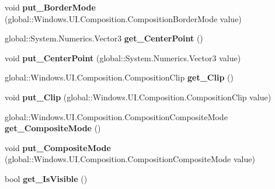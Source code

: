 \begin{DoxyCompactItemize}
void {\bfseries put\+\_\+\+Border\+Mode} (global\+::\+Windows.\+U\+I.\+Composition.\+Composition\+Border\+Mode value)
\item 
\mbox{\label{interface_windows_1_1_u_i_1_1_composition_1_1_i_visual_a155a09b37b8789970281666bc3111f3d}} 
global\+::\+System.\+Numerics.\+Vector3 {\bfseries get\+\_\+\+Center\+Point} ()
\item 
\mbox{\label{interface_windows_1_1_u_i_1_1_composition_1_1_i_visual_ac736f9c5171d694ea168970125dee881}} 
void {\bfseries put\+\_\+\+Center\+Point} (global\+::\+System.\+Numerics.\+Vector3 value)
\item 
\mbox{\label{interface_windows_1_1_u_i_1_1_composition_1_1_i_visual_ad0c2e9949756caf002a9224770412cd2}} 
global\+::\+Windows.\+U\+I.\+Composition.\+Composition\+Clip {\bfseries get\+\_\+\+Clip} ()
\item 
\mbox{\label{interface_windows_1_1_u_i_1_1_composition_1_1_i_visual_aa89c3bfb77967afd71d66e1adb50d78a}} 
void {\bfseries put\+\_\+\+Clip} (global\+::\+Windows.\+U\+I.\+Composition.\+Composition\+Clip value)
\item 
\mbox{\label{interface_windows_1_1_u_i_1_1_composition_1_1_i_visual_a8d4c301ec2cd6a02a533dd5077a01dcf}} 
global\+::\+Windows.\+U\+I.\+Composition.\+Composition\+Composite\+Mode {\bfseries get\+\_\+\+Composite\+Mode} ()
\item 
\mbox{\label{interface_windows_1_1_u_i_1_1_composition_1_1_i_visual_a23a31d796c4457b2e748aa0b505ad7c8}} 
void {\bfseries put\+\_\+\+Composite\+Mode} (global\+::\+Windows.\+U\+I.\+Composition.\+Composition\+Composite\+Mode value)
\item 
\mbox{\label{interface_windows_1_1_u_i_1_1_composition_1_1_i_visual_a40a0aa33cd325b0495e9d619fa205241}} 
bool {\bfseries get\+\_\+\+Is\+Visible} ()
\item 
\mbox{\label{interface_windows_1_1_u_i_1_1_composition_1_1_i_visual_a0050bae560148650b7020aec205c3506}} 

\end{DoxyCompactItemize}
